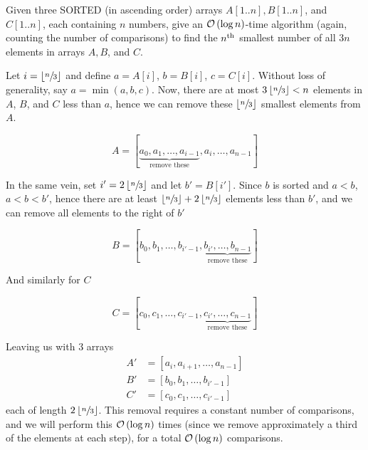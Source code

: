 \documentclass[draft]{article}
\begin{document}
\begin{exercise}{5.9}
    Given three SORTED (in ascending order) arrays $A[1..n], B[1..n]$,
    and $C[1..n]$, each containing $n$ numbers, give an $\mathcal{O}\left(\log n\right)$-time algorithm (again, counting the number of comparisons) to find the $n^{\text{th}}$ smallest number of all $3n$
    elements in arrays $A, B$, and $C$.
\end{exercise}

\begin{solution}
    Let $i = \left\lfloor\sfrac{n}{3}\right\rfloor$ and define $a=A[i]$, $b = B[i]$, $c = C[i]$. Without loss of generality, say $a = \min(a, b, c)$. Now, there are at most $3\left\lfloor\sfrac{n}{3}\right\rfloor < n$ elements in $A$, $B$, and $C$ less than $a$, hence we can remove these $\left\lfloor\sfrac{n}{3}\right\rfloor$ smallest elements from $A$.

    \[A = [\underbrace{a_0, a_1, \dots, a_{i-1}}_{\text{remove these}}, a_i, \dots, a_{n - 1}]\]

    In the same vein, set $i' = 2\left\lfloor\sfrac{n}{3}\right\rfloor$ and let $b' = B[i']$. Since $b$ is sorted and $a < b$, $a < b < b'$, hence there are at least $\left\lfloor\sfrac{n}{3}\right\rfloor + 2\left\lfloor\sfrac{n}{3}\right\rfloor$ elements less than $b'$, and we can remove all elements to the right of $b'$

    \[B = [b_0, b_1, \dots, b_{i'-1}, \underbrace{b_{i'}, \dots, b_{n - 1}}_{\text{remove these}}]\]

    And similarly for $C$

    \[C = [c_0, c_1, \dots, c_{i'-1}, \underbrace{c_{i'}, \dots, c_{n - 1}}_{\text{remove these}}]\]

    Leaving us with 3 arrays
    \begin{align*}
        A' & = [a_i, a_{i + 1}, \dots, a_{n - 1}] \\
        B' & = [b_0, b_1, \dots, b_{i'-1}]        \\
        C' & = [c_0, c_1, \dots, c_{i'-1}]
    \end{align*}
    each of length $2\left\lfloor\sfrac{n}{3}\right\rfloor$. This removal requires a constant number of comparisons, and we will perform this $\mathcal{O}\left(\log{n}\right)$ times (since we remove approximately a third of the elements at each step), for a total $\mathcal{O}\left(\log{n}\right)$ comparisons.

\end{solution}
\end{document}
